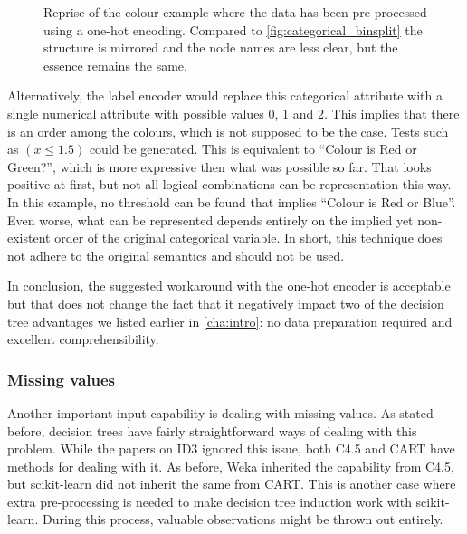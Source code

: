 \begin{figure}[htp]
\begin{center}
\end{center}
\caption{Reprise of the colour example where the data has been pre-processed using a one-hot encoding. Compared to \autoref{fig:categorical_binsplit} the structure is mirrored and the node names are less clear, but the essence remains the same.}%
\label{fig:colour_onehot}
\end{figure}

Alternatively, the label encoder would replace this categorical attribute with a single numerical attribute with possible values 0, 1 and 2. This implies that there is an order among the colours, which is not supposed to be the case. Tests such as $(x \leqslant 1.5)$ could be generated. This is equivalent to ``Colour is Red or Green?'', which is more expressive then what was possible so far. That looks positive at first, but not all logical combinations can be representation this way. In this example, no threshold can be found that implies ``Colour is Red or Blue''. Even worse, what can be represented depends entirely on the implied yet non-existent order of the original categorical variable. In short, this technique does not adhere to the original semantics and should not be used.

In conclusion, the suggested workaround with the one-hot encoder is acceptable but that does not change the fact that it negatively impact two of the decision tree advantages we listed earlier in \autoref{cha:intro}: no data preparation required and excellent comprehensibility.

\subsubsection{Missing values}
Another important input capability is dealing with missing values. As stated before, decision trees have fairly straightforward ways of dealing with this problem. While the papers on ID3 ignored this issue, both C4.5 and CART have methods for dealing with it. As before, Weka inherited the capability from C4.5, but scikit-learn did not inherit the same from CART. This is another case where extra pre-processing is needed to make decision tree induction work with scikit-learn. During this process, valuable observations might be thrown out entirely.

